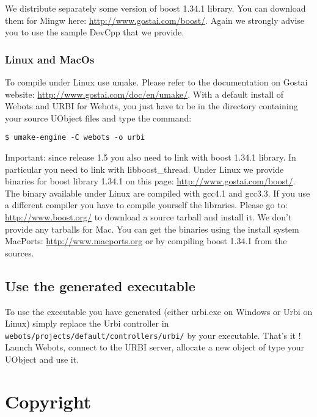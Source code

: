We distribute separately some version of boost 1.34.1 library. You can
download them for Mingw here: \url{http://www.gostai.com/boost/}.
Again we strongly advise you to use the sample DevCpp that we provide.


\subsubsection{Linux and MacOs}
\label{webots.ownuobjects.compile.linux}%

To compile under Linux use umake. Please refer to the documentation on
Gostai website: \url{http://www.gostai.com/doc/en/umake/}.  With a
default install of Webots and URBI for Webots, you just have to be in
the directory containing your source UObject files and type the
command:

\begin{lstlisting}
$ umake-engine -C webots -o urbi
\end{lstlisting}


Important: since release 1.5 you also need to link with boost 1.34.1
library.  In particular you need to link with libboost\_thread. Under
Linux we provide binaries for boost library 1.34.1 on this page:
\url{http://www.gostai.com/boost/}. The binary available under Linux
are compiled with gcc4.1 and gcc3.3. If you use a different compiler
you have to compile yourself the libraries. Please go to:
\url{http://www.boost.org/} to download a source tarball and install
it.  We don't provide any tarballs for Mac. You can get the binaries
using the install system MacPorts: \url{http://www.macports.org} or by
compiling boost 1.34.1 from the sources.


\subsection{Use the generated executable}
\label{webots.ownuobjects.use}%

To use the executable you have generated (either urbi.exe on Windows
or Urbi on Linux) simply replace the Urbi controller in
\nolinkurl{webots/projects/default/controllers/urbi/} by your
executable. That's it ! Launch Webots, connect to the URBI server,
allocate a new object of type your UObject and use it.

\appendix
\section{Copyright}
\label{webots.copyright}%

